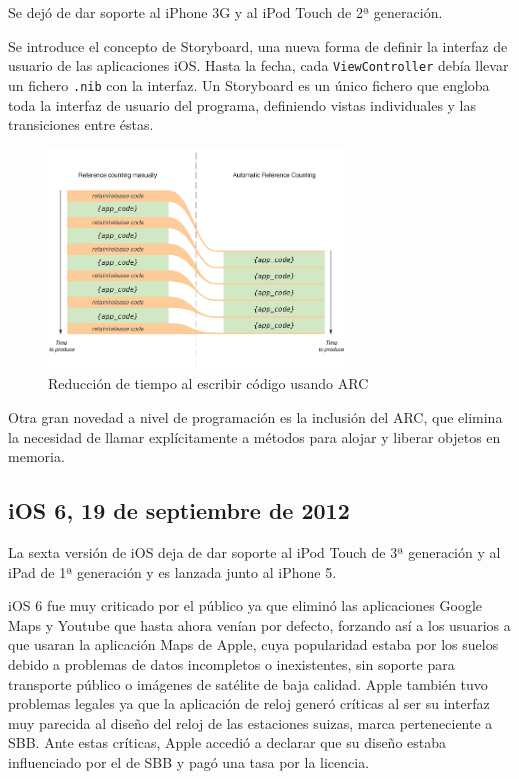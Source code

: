 Se dejó de dar soporte al iPhone 3G y al iPod Touch de 2ª generación.

Se introduce el concepto de Storyboard, una nueva forma de definir la interfaz de usuario de las aplicaciones iOS. Hasta la fecha, cada \texttt{ViewController} debía llevar un fichero \texttt{.nib} con la interfaz. Un Storyboard es un único fichero que engloba toda la interfaz de usuario del programa, definiendo vistas individuales y las transiciones entre éstas.

\begin{figure}[h]
	\centering
		\includegraphics[width=0.7\textwidth]{./img/ARC.png}
	\caption{Reducción de tiempo al escribir código usando ARC}
\end{figure}

Otra gran novedad a nivel de programación es la inclusión del ARC, que elimina la necesidad de llamar explícitamente a métodos para alojar y liberar objetos en memoria.

\subsection{iOS 6, 19 de septiembre de 2012}
La sexta versión de iOS deja de dar soporte al iPod Touch de 3ª generación y al iPad de 1ª generación y es lanzada junto al iPhone 5.

iOS 6 fue muy criticado por el público ya que eliminó las aplicaciones Google Maps y Youtube que hasta ahora venían por defecto, forzando así a los usuarios a que usaran la aplicación Maps de Apple, cuya popularidad estaba por los suelos debido a problemas de datos incompletos o inexistentes, sin soporte para transporte público o imágenes de satélite de baja calidad. Apple también tuvo problemas legales ya que la aplicación de reloj generó críticas al ser su interfaz muy parecida al diseño del reloj de las estaciones suizas, marca perteneciente a SBB. Ante estas críticas, Apple accedió a declarar que su diseño estaba influenciado por el de SBB y pagó una tasa por la licencia. 

